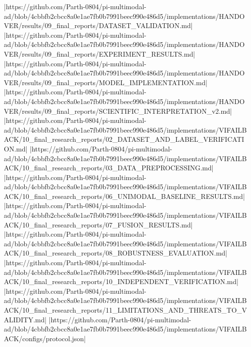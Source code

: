 |https://github.com/Parth-0804/pi-multimodal-ad/blob/4cbbfb2cbcc8a0e1ae7fb0b7991beec990e486d5/implementations/HANDOVER/results/09_final_reports/DATASET_VALIDATION.md|
|https://github.com/Parth-0804/pi-multimodal-ad/blob/4cbbfb2cbcc8a0e1ae7fb0b7991beec990e486d5/implementations/HANDOVER/results/09_final_reports/EXPERIMENT_RESULTS.md|
|https://github.com/Parth-0804/pi-multimodal-ad/blob/4cbbfb2cbcc8a0e1ae7fb0b7991beec990e486d5/implementations/HANDOVER/results/09_final_reports/MODEL_IMPLEMENTATION.md|
|https://github.com/Parth-0804/pi-multimodal-ad/blob/4cbbfb2cbcc8a0e1ae7fb0b7991beec990e486d5/implementations/HANDOVER/results/09_final_reports/SCIENTIFIC_INTERPRETATION_v2.md|
|https://github.com/Parth-0804/pi-multimodal-ad/blob/4cbbfb2cbcc8a0e1ae7fb0b7991beec990e486d5/implementations/VIFAILBACK/10_final_research_reports/02_DATASET_AND_LABEL_VERIFICATION.md|
|https://github.com/Parth-0804/pi-multimodal-ad/blob/4cbbfb2cbcc8a0e1ae7fb0b7991beec990e486d5/implementations/VIFAILBACK/10_final_research_reports/03_DATA_PREPROCESSING.md|
|https://github.com/Parth-0804/pi-multimodal-ad/blob/4cbbfb2cbcc8a0e1ae7fb0b7991beec990e486d5/implementations/VIFAILBACK/10_final_research_reports/06_UNIMODAL_BASELINE_RESULTS.md|
|https://github.com/Parth-0804/pi-multimodal-ad/blob/4cbbfb2cbcc8a0e1ae7fb0b7991beec990e486d5/implementations/VIFAILBACK/10_final_research_reports/07_FUSION_RESULTS.md|
|https://github.com/Parth-0804/pi-multimodal-ad/blob/4cbbfb2cbcc8a0e1ae7fb0b7991beec990e486d5/implementations/VIFAILBACK/10_final_research_reports/08_ROBUSTNESS_EVALUATION.md|
|https://github.com/Parth-0804/pi-multimodal-ad/blob/4cbbfb2cbcc8a0e1ae7fb0b7991beec990e486d5/implementations/VIFAILBACK/10_final_research_reports/10_INDEPENDENT_VERIFICATION.md|
|https://github.com/Parth-0804/pi-multimodal-ad/blob/4cbbfb2cbcc8a0e1ae7fb0b7991beec990e486d5/implementations/VIFAILBACK/10_final_research_reports/11_LIMITATIONS_AND_THREATS_TO_VALIDITY.md|
|https://github.com/Parth-0804/pi-multimodal-ad/blob/4cbbfb2cbcc8a0e1ae7fb0b7991beec990e486d5/implementations/VIFAILBACK/configs/protocol.json|

